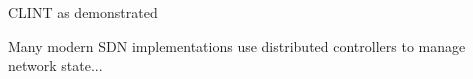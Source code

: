     CLINT as demonstrated 

    Many modern SDN implementations use distributed controllers to manage network state...

